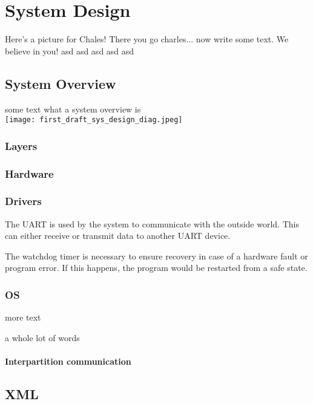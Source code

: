 \chapter{System Design}

Here's a picture for Chales!
There you go charles... now write some text. We believe in you!
asd
asd
asd
asd
asd

\section{System Overview}
some text what a system overview is \\
\texttt{[image: first\_draft\_sys\_design\_diag.jpeg]}

\subsection{Layers}


\subsection{Hardware}

\subsection{Drivers}
\begin{description}[align=left]
	\item [\textbf{UART driver}] The UART is used by the system to communicate with the outside
	world. This can either receive or transmit data to another UART device.
	\item [\textbf{Watchdog timer driver}] The watchdog timer is necessary to ensure recovery
	in case of a hardware fault or program error. If this happens, the program would be restarted
	from a safe state. 
	
\end{description}

\subsection{OS}
\begin{description}[align=left]
	\item [\textbf{scheduler}] more text
	\item [\textbf{scheduler}] a whole lot of words
\end{description}
\subsubsection{Interpartition communication}

\section{XML}
